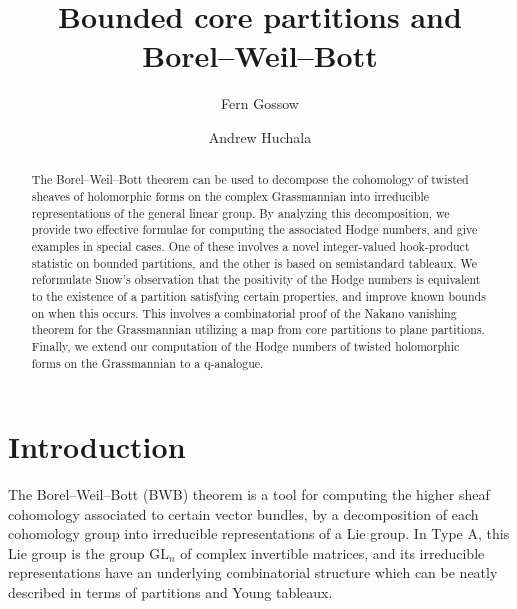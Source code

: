 \documentclass{amsart}
\title{Bounded core partitions and Borel--Weil--Bott}
\author{Fern Gossow}
\author{Andrew Huchala}
\newcommand\GL{\mathrm{GL}}
\theoremstyle{plain}
\theoremstyle{definition}
\numberwithin{equation}{section}
\begin{document}
\begin{abstract}
The Borel--Weil--Bott theorem can be used to decompose the cohomology of twisted sheaves of holomorphic forms on the complex Grassmannian into irreducible representations of the general linear group. By analyzing this decomposition, we provide two effective formulae for computing the associated Hodge numbers, and give examples in special cases. One of these involves a novel integer-valued hook-product statistic on bounded partitions, and the other is based on semistandard tableaux. We reformulate Snow's observation that the positivity of the Hodge numbers is equivalent to the existence of a partition satisfying certain properties, and improve known bounds on when this occurs. This involves a combinatorial proof of the Nakano vanishing theorem for the Grassmannian utilizing a map from  core partitions to plane partitions. Finally, we extend our computation of the Hodge numbers of twisted holomorphic forms on the Grassmannian to a q-analogue.
\end{abstract}

\vspace*{-1cm}
\maketitle

\section{Introduction}

The Borel--Weil--Bott (BWB) theorem \cite{Serre95} is a tool for computing the higher sheaf cohomology associated to certain vector bundles, by a decomposition of each cohomology group into irreducible representations of a Lie group. In Type A, this Lie group is the group $\GL_n$ of complex invertible matrices, and its irreducible representations have an underlying combinatorial structure which can be neatly described in terms of partitions and Young tableaux. 
\end{document}
